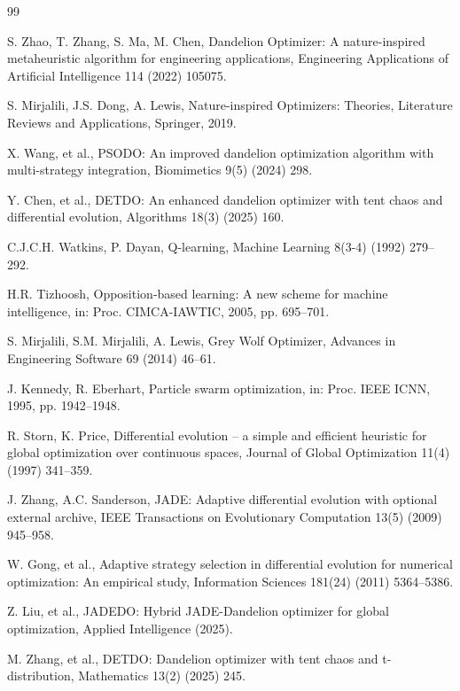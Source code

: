 \documentclass[preprint,12pt]{elsarticle}
\begin{document}
\begin{thebibliography}{99}

S. Zhao, T. Zhang, S. Ma, M. Chen, Dandelion Optimizer: A nature-inspired metaheuristic algorithm for engineering applications, Engineering Applications of Artificial Intelligence 114 (2022) 105075.

S. Mirjalili, J.S. Dong, A. Lewis, Nature-inspired Optimizers: Theories, Literature Reviews and Applications, Springer, 2019.

X. Wang, et al., PSODO: An improved dandelion optimization algorithm with multi-strategy integration, Biomimetics 9(5) (2024) 298.

Y. Chen, et al., DETDO: An enhanced dandelion optimizer with tent chaos and differential evolution, Algorithms 18(3) (2025) 160.

C.J.C.H. Watkins, P. Dayan, Q-learning, Machine Learning 8(3-4) (1992) 279--292.

H.R. Tizhoosh, Opposition-based learning: A new scheme for machine intelligence, in: Proc. CIMCA-IAWTIC, 2005, pp. 695--701.

S. Mirjalili, S.M. Mirjalili, A. Lewis, Grey Wolf Optimizer, Advances in Engineering Software 69 (2014) 46--61.

J. Kennedy, R. Eberhart, Particle swarm optimization, in: Proc. IEEE ICNN, 1995, pp. 1942--1948.

R. Storn, K. Price, Differential evolution -- a simple and efficient heuristic for global optimization over continuous spaces, Journal of Global Optimization 11(4) (1997) 341--359.

J. Zhang, A.C. Sanderson, JADE: Adaptive differential evolution with optional external archive, IEEE Transactions on Evolutionary Computation 13(5) (2009) 945--958.

W. Gong, et al., Adaptive strategy selection in differential evolution for numerical optimization: An empirical study, Information Sciences 181(24) (2011) 5364--5386.

Z. Liu, et al., JADEDO: Hybrid JADE-Dandelion optimizer for global optimization, Applied Intelligence (2025).

M. Zhang, et al., DETDO: Dandelion optimizer with tent chaos and t-distribution, Mathematics 13(2) (2025) 245.

\end{thebibliography}
\end{document}
